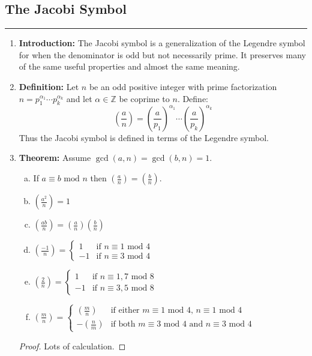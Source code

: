 \documentclass[class=article, crop=false]{standalone}
\def\integers{{\mathbb Z}}
\begin{document}
\subsection{The Jacobi Symbol}
\rule{\textwidth}{1pt}
\begin{enumerate}
	\item \textbf{Introduction:} The Jacobi symbol is a generalization of the Legendre symbol
	for when the denominator is odd but not necessarily prime. It preserves many of the same
	useful properties and almost the same meaning.

	\item \textbf{Definition:} Let $n$ be an odd positive integer with prime factorization
	$n=p_1^{\alpha_1} \cdots p_k^{\alpha_k}$ and let $\alpha\in\integers$ be coprime to $n$. Define:
	$$\left(\frac{a}{n}\right) = \left(\frac{a}{p_1}\right)^{\alpha_1} \cdots \left(\frac{a}{p_k}\right)^{\alpha_k}$$
	Thus the Jacobi symbol is defined in terms of the Legendre symbol.

	\item \textbf{Theorem:} Assume $\gcd(a,n)=\gcd(b,n)=1$.
	\begin{enumerate}[(a)]
		\item If $a\equiv b\mbox{ mod }n$ then $\left(\frac{a}{n}\right) = \left(\frac{b}{n}\right)$.
		\item $\left(\frac{a^2}{n}\right) = 1$
		\item $\left(\frac{ab}{n}\right) = \left(\frac{a}{n}\right) \left(\frac{b}{n}\right)$
		\item $\left(\frac{-1}{n}\right) = \begin{cases}
			1 &\text{if $n\equiv 1\mbox{ mod } 4$}\\
			-1 &\text{if $n\equiv 3\mbox{ mod } 4$}
		\end{cases}$
		\item $\left(\frac{2}{n}\right) = \begin{cases}
			1 &\text{if $n\equiv 1,7\mbox{ mod } 8$}\\
			-1 &\text{if $n\equiv 3,5\mbox{ mod } 8$}\end{cases}$
		\item $\left(\frac{m}{n}\right) = \begin{cases}
			\left(\frac{m}{n}\right) &\text{if either $m\equiv 1\mbox{ mod }4$, $n\equiv 1\mbox{ mod } 4$} \\
			-\left(\frac{n}{m}\right) &\text{if both $m\equiv 3\mbox{ mod }4$ and $n\equiv 3\mbox{ mod } 4$}
		\end{cases}$
 	\end{enumerate}
	\begin{proof}
		Lots of calculation.
	\end{proof}


\end{enumerate}
\end{document}
